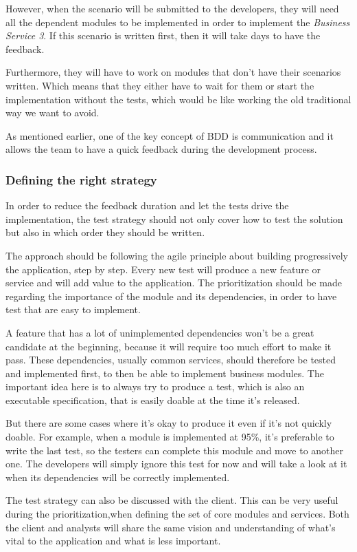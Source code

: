 However, when the scenario will be submitted to the developers, they will
need all the dependent modules to be implemented in order to implement the
\textit{Business Service 3}.
If this scenario is written first, then it will take days to have the feedback.

Furthermore, they will have to work on modules that don't have their
scenarios written.
Which means that they either have to wait for them or start the
implementation without the tests, which would be like working the old
traditional way we want to avoid.

As mentioned earlier, one of the key concept of BDD is communication and it
allows the team to have a quick feedback during the development process.

\subsubsection{Defining the right strategy}
In order to reduce the feedback duration and let the tests drive the
implementation, the test strategy should not only cover how to test the
solution but also in which order they should be written.

The approach should be following the agile principle about building
progressively the application, step by step.
Every new test will produce a new feature or service and will add value
to the application.
The prioritization should be made regarding the importance of the module and
its dependencies, in order to have test that are easy to implement.

A feature that has a lot of unimplemented dependencies won't be a great
candidate at the beginning, because it will require too much effort to make
it pass.
These dependencies, usually common services, should therefore be tested
and implemented first, to then be able to implement business modules.
The important idea here is to always try to produce a test, which is also an
executable specification, that is easily doable at the time it's released.

But there are some cases where it's okay to produce it even if it's not
quickly doable.
For example, when a module is implemented at 95\%, it's preferable to write
the last test, so the testers can complete this module and move to another one.
The developers will simply ignore this test for now and will take a look at
it when its dependencies will be correctly implemented.

The test strategy can also be discussed with the client.
This can be very useful during the prioritization,when defining the set of
core modules and services.
Both the client and analysts will share the same vision and understanding of
what's vital to the application and what is less important.

